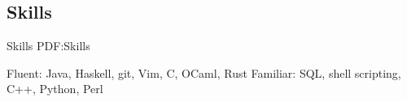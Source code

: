 \documentclass[letterpaper,10pt,oneside]{simpleresume}
\begin{document}
\begin{minipage}[t][0pt]{\linewidth}
\begin{body}



\section%
{Skills}
{Skills}
{PDF:Skills}

Fluent: Java, Haskell, git, Vim, C, OCaml, Rust
\GapNoBreak%
Familiar: SQL, shell scripting, C++, Python, Perl

\end{body}
\end{minipage}
\end{document}
